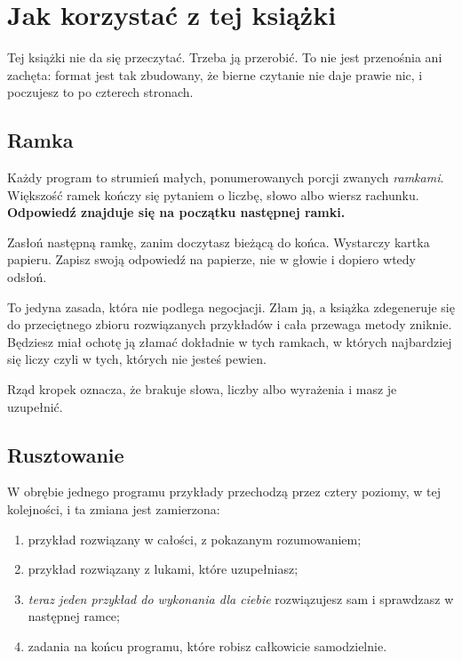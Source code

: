 \chapter*{Jak korzystać z tej książki}
{}

\noindent
Tej książki nie da się przeczytać. Trzeba ją przerobić. To nie jest przenośnia
ani zachęta: format jest tak zbudowany, że bierne czytanie nie daje prawie
nic, i poczujesz to po czterech stronach.

\section*{Ramka}

Każdy program to strumień małych, ponumerowanych porcji zwanych
\emph{ramkami}. Większość ramek kończy się pytaniem \dash{} o liczbę, słowo
albo wiersz rachunku. \textbf{Odpowiedź znajduje się na początku następnej
ramki.}

\begin{warning}
Zasłoń następną ramkę, zanim doczytasz bieżącą do końca. Wystarczy kartka
papieru. Zapisz swoją odpowiedź \dash{} na papierze, nie w głowie \dash{} i dopiero
wtedy odsłoń.

To jedyna zasada, która nie podlega negocjacji. Złam ją, a książka zdegeneruje
się do przeciętnego zbioru rozwiązanych przykładów i cała przewaga metody
zniknie. Będziesz miał ochotę ją złamać dokładnie w tych ramkach, w których
najbardziej się liczy \dash{} czyli w tych, których nie jesteś pewien.
\end{warning}

\noindent
Rząd kropek \blank{} oznacza, że brakuje słowa, liczby albo wyrażenia i masz
je uzupełnić.

\section*{Rusztowanie}

W obrębie jednego programu przykłady przechodzą przez cztery poziomy, w tej
kolejności, i ta zmiana jest zamierzona:

\begin{enumerate}[leftmargin=1.6em, itemsep=3pt]
  \item przykład rozwiązany w całości, z pokazanym rozumowaniem;
  \item przykład rozwiązany z lukami, które uzupełniasz;
  \item \emph{teraz jeden przykład do wykonania dla ciebie} \dash{} rozwiązujesz
        sam i sprawdzasz w następnej ramce;
  \item zadania na końcu programu, które robisz całkowicie samodzielnie.
\end{enumerate}

